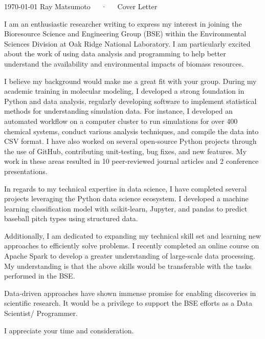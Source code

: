 \documentclass[11pt, a4paper]{awesome-cv}
\begin{document}
\makecvheader[R]

\makecvfooter
  {\today}
  {Ray Matsumoto~~~·~~~Cover Letter}
  {}

\makelettertitle

\begin{cvletter}

I am an enthusiastic researcher writing to express my interest in
    joining the Bioresource Science and Engineering Group (BSE) within the Environmental Sciences Division at Oak Ridge National Laboratory.  
    I am particularly excited about the work of using data analysis and programming to help
    better understand the availability and environmental impacts of biomass
    resources.

    I believe my background would make me a great fit with your group.  During my
    academic training in molecular modeling, I developed a strong foundation in
    Python and data analysis, regularly developing software to implement
    statistical methods for understanding simulation data.  
    For instance, I developed an automated workflow on a computer cluster to run simulations for over 
    400 chemical systems, conduct various analysis techniques, and compile the data into CSV format.  
    I have also worked on several open-source Python
    projects through the use of GitHub, contributing unit-testing, bug fixes,
    and new features.
    My work in these areas resulted in 10 peer-reviewed journal articles and 2
    conference presentations.

    In regards to my technical expertise in data science, I have completed
    several projects leveraging the Python data science ecosystem.  I developed
    a machine learning classification model with scikit-learn, Jupyter, and
    pandas to predict baseball pitch types using structured data.  

    Additionally, I am dedicated to expanding my technical skill set and learning new approaches to
    efficiently solve problems.  
    I recently completed an online course on Apache Spark to develop a greater understanding of large-scale data processing.
    My understanding is that the above skills would be
    transferable with the tasks performed in the BSE.

    Data-driven approaches have shown immense promise for enabling discoveries
    in scientific research.  It would be a privilege to support the
    BSE efforts as a Data Scientist/ Programmer.

    I appreciate your time and consideration.


\end{cvletter}


\makeletterclosing
\end{document}
